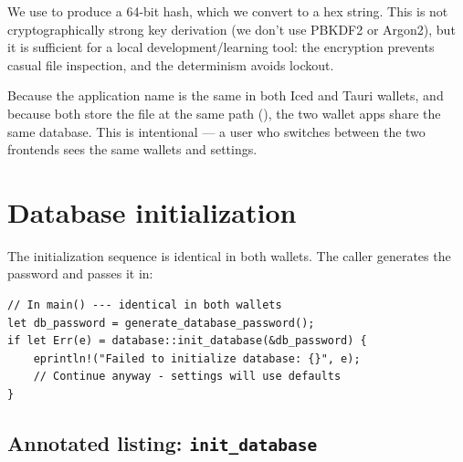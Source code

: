 We use  to produce a 64-bit hash, which we convert to a hex string. This is not cryptographically strong key derivation (we don't use PBKDF2 or Argon2), but it is sufficient for a local development/learning tool: the encryption prevents casual file inspection, and the determinism avoids lockout.

\begin{notebox}
Because the application name  is the same in both Iced and Tauri wallets, and because both store the file at the same path (), the two wallet apps share the same database. This is intentional --- a user who switches between the two frontends sees the same wallets and settings.
\end{notebox}

\section{Database initialization}
\label{sec:init-database}

The initialization sequence is identical in both wallets. The caller generates the password and passes it in:

\begin{verbatim}
// In main() --- identical in both wallets
let db_password = generate_database_password();
if let Err(e) = database::init_database(&db_password) {
    eprintln!("Failed to initialize database: {}", e);
    // Continue anyway - settings will use defaults
}
\end{verbatim}

\subsection{Annotated listing: \texttt{init\_database}}
\label{sec:init-database-fn}

